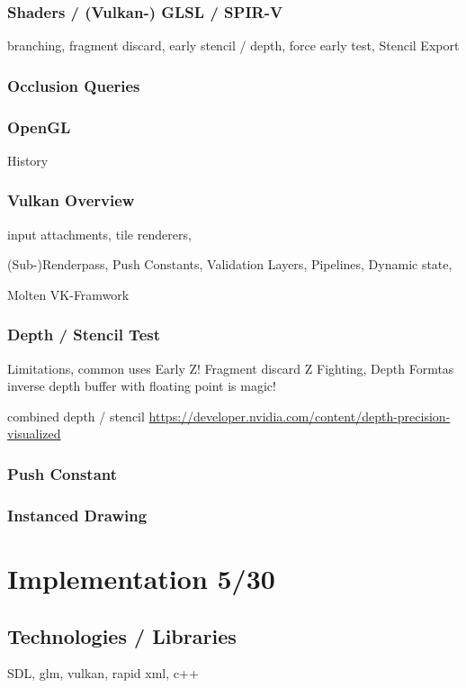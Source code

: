 \subsubsection{Shaders / (Vulkan-) GLSL / SPIR-V}
branching, fragment discard, early stencil / depth, force early test, Stencil Export

\subsubsection{Occlusion Queries}

\subsubsection{OpenGL}
History


\subsubsection{Vulkan Overview}
input attachments, tile renderers,

(Sub-)Renderpass, Push Constants, Validation Layers, Pipelines, Dynamic state,

Molten VK-Framwork

\subsubsection{Depth / Stencil Test}
Limitations, common uses
Early Z! Fragment discard
Z Fighting,
Depth Formtas
inverse depth buffer with floating point is magic!

combined depth / stencil
\url{https://developer.nvidia.com/content/depth-precision-visualized}

\subsubsection{Push Constant}

\subsubsection{Instanced Drawing}

\section{Implementation 5/30}

\subsection{Technologies / Libraries}
SDL, glm, vulkan, rapid xml, c++

